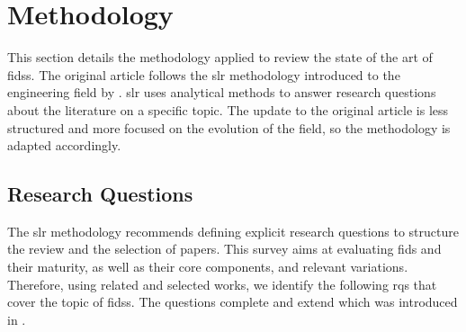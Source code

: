 \section{Methodology\label{sec:sota.methodo}}

This section details the methodology applied to review the state of the art of \glspl{fids}.
The original article follows the \gls{slr} methodology introduced to the engineering field by \textcite{kitchenham_Guidelinesperformingsystematic_2007}.
\Gls{slr} uses analytical methods to answer research questions about the literature on a specific topic.
The update to the original article is less structured and more focused on the evolution of the field, so the methodology is adapted accordingly.


\subsection{Research Questions\label{sec:sota.methodo.questions}}

The \gls{slr} methodology recommends defining explicit research questions to structure the review
and the selection of papers.
This survey aims at evaluating \gls{fids} and their maturity, as well
as their core components, and relevant variations.
Therefore, using related and selected works, we identify the following \glspl{rq} that cover the topic of \glspl{fids}.
The questions complete and extend  which was introduced in .

